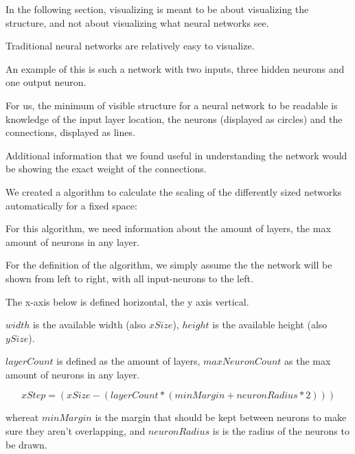 In the following section, visualizing is meant to be about visualizing the structure, and not about visualizing what neural networks see.\cite{deepnetworkvisualizing2015}

Traditional neural networks are relatively easy to visualize.

An example of this is such a network with two inputs, three hidden neurons and one output neuron.

{\centering
	\begin{neuralnetwork}[height=3, nodespacing=1.5cm]
		\newcommand{\nodelabel}[2]{
			\ifnum#1=0 $x_#2$ \fi
			\ifnum#1=1 $y_#2$ \fi
			\ifnum#1=2 $z_#2$ \fi
		}
		\setdefaultnodetext{\nodelabel}
		\hiddenlayer[count=3, bias=false, title=] \linklayers
		\outputlayer[count=1, title=] \linklayers
	\end{neuralnetwork}
	\par}

For us, the minimum of visible structure for a neural network to be readable is knowledge of the input layer location, the neurons (displayed as circles) and the connections, displayed as lines.

Additional information that we found useful in understanding the network would be showing the exact weight of the connections.

We created a algorithm to calculate the scaling of the differently sized networks automatically for a fixed space:

For this algorithm, we need information about the amount of layers, the max amount of neurons in any layer.

For the definition of the algorithm, we simply assume the the network will be shown from left to right, with all input-neurons to the left.

The x-axis below is defined horizontal, the y axis vertical.

$ width $ is the available width (also $ xSize $), $ height $ is the available height (also $ ySize $).

$ layerCount $ is defined as the amount of layers, $ maxNeuronCount $ as the max amount of neurons in any layer.

$$ xStep = (xSize - (layerCount * (minMargin + neuronRadius * 2))) $$

 whereat $ minMargin $ is the margin that should be kept between neurons to make sure they aren't overlapping, and $ neuronRadius $ is is the radius of the neurons to be drawn.
